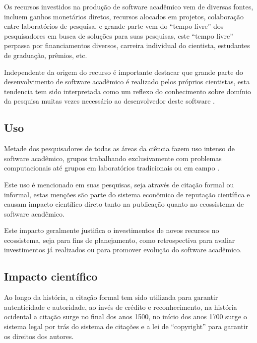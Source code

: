 Os recursos investidos na produção de software acadêmico vem de diversas fontes,
incluem ganhos monetários diretos, recursos alocados em projetos, colaboração
entre laboratórios de pesquisa, e grande parte vem do ``tempo livre'' dos
pesquisadores em busca de soluções para suas pesquisas, este ``tempo livre''
perpassa por financiamentos diversos, carreira individual do cientista,
estudantes de graduação, prêmios, etc.

Independente da origem do recurso é importante destacar que grande parte do
desenvolvimento de software acadêmico é realizado pelos próprios cientistas,
esta tendencia tem sido interpretada como um reflexo do conhecimento sobre
domínio da pesquisa muitas vezes necessário ao desenvolvedor deste software
\cite{segal2008developing, hettrick_2014_14809, momcheva2015software}.

\subsection{Uso}


Metade dos pesquisadores de todas as áreas da ciência fazem uso
intenso de software acadêmico, grupos trabalhando exclusivamente com
problemas computacionais até grupos em laboratórios tradicionais ou em campo
\cite{wilson2014best}.

Este uso é mencionado em suas pesquisas, seja através de citação formal ou
informal, estas menções são parte do sistema econômico de reputação científica
e causam impacto científico direto tanto na publicação quanto no ecossistema de
software acadêmico.

Este impacto geralmente justifica o investimentos de novos recursos no
ecossistema, seja para fins de planejamento, como retrospectiva para avaliar
investimentos já realizados ou para promover evolução do software acadêmico.

\subsection{Impacto científico}


Ao longo da história, a citação formal tem sido utilizada para garantir
autenticidade e autoridade, ao invés de crédito e reconhecimento, na história
ocidental a citação surge no final dos anos 1500, no início dos anos 1700 surge
o sistema legal por trás do sistema de citações e a lei de ``copyright'' para
garantir os direitos dos autores.

